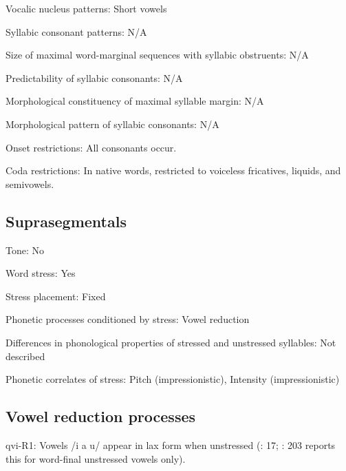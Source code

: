 {\begin{appendixdesc}
\item[Vocalic nucleus patterns:] Short vowels

\item[Syllabic consonant patterns:] N/A

\item[Size of maximal word-marginal sequences with syllabic obstruents:] N/A

\item[Predictability of syllabic consonants:] N/A

\item[Morphological constituency of maximal syllable margin:] N/A

\item[Morphological pattern of syllabic consonants:] N/A

\item[Onset restrictions:] All consonants occur.

\item[Coda restrictions:] In native words, restricted to voiceless fricatives, liquids, and semivowels.
\end{appendixdesc}
\subsection*{Suprasegmentals}
\begin{appendixdesc}
\item[Tone:] No

\item[Word stress:] Yes

\item[Stress placement:] Fixed

\item[Phonetic processes conditioned by stress:] Vowel reduction

\item[Differences in phonological properties of stressed and unstressed syllables:] Not described

\item[Phonetic correlates of stress:] Pitch (impressionistic), Intensity (impressionistic)
\end{appendixdesc}
\subsection*{Vowel reduction processes}
\begin{appendixdesc}

\item[qvi-R1:] Vowels /i a u/ appear in lax form when unstressed (\citealt{Jake1983}: 17; \citealt{Cole1982}: 203 reports this for word-final unstressed vowels only).
\end{appendixdesc}
}
